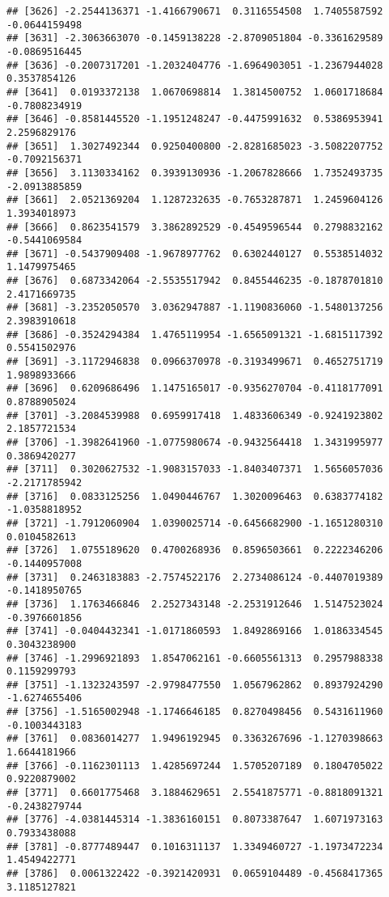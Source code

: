 \documentclass[
]{article}
\begin{document}
\begin{verbatim}
## [3626] -2.2544136371 -1.4166790671  0.3116554508  1.7405587592 -0.0644159498
## [3631] -2.3063663070 -0.1459138228 -2.8709051804 -0.3361629589 -0.0869516445
## [3636] -0.2007317201 -1.2032404776 -1.6964903051 -1.2367944028  0.3537854126
## [3641]  0.0193372138  1.0670698814  1.3814500752  1.0601718684 -0.7808234919
## [3646] -0.8581445520 -1.1951248247 -0.4475991632  0.5386953941  2.2596829176
## [3651]  1.3027492344  0.9250400800 -2.8281685023 -3.5082207752 -0.7092156371
## [3656]  3.1130334162  0.3939130936 -1.2067828666  1.7352493735 -2.0913885859
## [3661]  2.0521369204  1.1287232635 -0.7653287871  1.2459604126  1.3934018973
## [3666]  0.8623541579  3.3862892529 -0.4549596544  0.2798832162 -0.5441069584
## [3671] -0.5437909408 -1.9678977762  0.6302440127  0.5538514032  1.1479975465
## [3676]  0.6873342064 -2.5535517942  0.8455446235 -0.1878701810  2.4171669735
## [3681] -3.2352050570  3.0362947887 -1.1190836060 -1.5480137256  2.3983910618
## [3686] -0.3524294384  1.4765119954 -1.6565091321 -1.6815117392  0.5541502976
## [3691] -3.1172946838  0.0966370978 -0.3193499671  0.4652751719  1.9898933666
## [3696]  0.6209686496  1.1475165017 -0.9356270704 -0.4118177091  0.8788905024
## [3701] -3.2084539988  0.6959917418  1.4833606349 -0.9241923802  2.1857721534
## [3706] -1.3982641960 -1.0775980674 -0.9432564418  1.3431995977  0.3869420277
## [3711]  0.3020627532 -1.9083157033 -1.8403407371  1.5656057036 -2.2171785942
## [3716]  0.0833125256  1.0490446767  1.3020096463  0.6383774182 -1.0358818952
## [3721] -1.7912060904  1.0390025714 -0.6456682900 -1.1651280310  0.0104582613
## [3726]  1.0755189620  0.4700268936  0.8596503661  0.2222346206 -0.1440957008
## [3731]  0.2463183883 -2.7574522176  2.2734086124 -0.4407019389 -0.1418950765
## [3736]  1.1763466846  2.2527343148 -2.2531912646  1.5147523024 -0.3976601856
## [3741] -0.0404432341 -1.0171860593  1.8492869166  1.0186334545  0.3043238900
## [3746] -1.2996921893  1.8547062161 -0.6605561313  0.2957988338  0.1159299793
## [3751] -1.1323243597 -2.9798477550  1.0567962862  0.8937924290 -1.6274655406
## [3756] -1.5165002948 -1.1746646185  0.8270498456  0.5431611960 -0.1003443183
## [3761]  0.0836014277  1.9496192945  0.3363267696 -1.1270398663  1.6644181966
## [3766] -0.1162301113  1.4285697244  1.5705207189  0.1804705022  0.9220879002
## [3771]  0.6601775468  3.1884629651  2.5541875771 -0.8818091321 -0.2438279744
## [3776] -4.0381445314 -1.3836160151  0.8073387647  1.6071973163  0.7933438088
## [3781] -0.8777489447  0.1016311137  1.3349460727 -1.1973472234  1.4549422771
## [3786]  0.0061322422 -0.3921420931  0.0659104489 -0.4568417365  3.1185127821

\end{verbatim}
\end{document}
